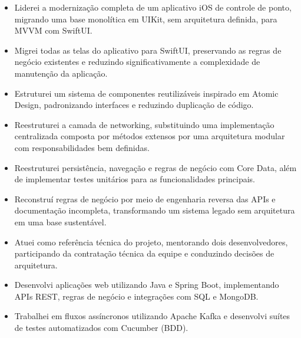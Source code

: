 \documentclass[10pt,a4paper]{article}
\begin{document}

\begin{itemize}

\item Liderei a modernização completa de um aplicativo iOS de controle de ponto, migrando uma base monolítica em UIKit, sem arquitetura definida, para MVVM com SwiftUI.

\item Migrei todas as telas do aplicativo para SwiftUI, preservando as regras de negócio existentes e reduzindo significativamente a complexidade de manutenção da aplicação.

\item Estruturei um sistema de componentes reutilizáveis inspirado em Atomic Design, padronizando interfaces e reduzindo duplicação de código.

\item Reestruturei a camada de networking, substituindo uma implementação centralizada composta por métodos extensos por uma arquitetura modular com responsabilidades bem definidas.

\item Reestruturei persistência, navegação e regras de negócio com Core Data, além de implementar testes unitários para as funcionalidades principais.

\item Reconstruí regras de negócio por meio de engenharia reversa das APIs e documentação incompleta, transformando um sistema legado sem arquitetura em uma base sustentável.

\item Atuei como referência técnica do projeto, mentorando dois desenvolvedores, participando da contratação técnica da equipe e conduzindo decisões de arquitetura.

\end{itemize}


\begin{itemize}

\item Desenvolvi aplicações web utilizando Java e Spring Boot, implementando APIs REST, regras de negócio e integrações com SQL e MongoDB.

\item Trabalhei em fluxos assíncronos utilizando Apache Kafka e desenvolvi suítes de testes automatizados com Cucumber (BDD).

\end{itemize}
\end{document}
